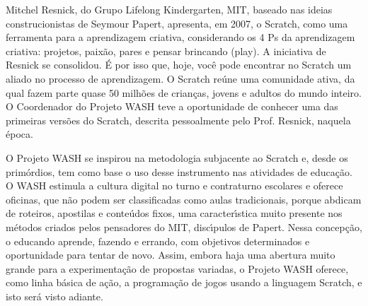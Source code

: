 \documentclass[
12pt,		%
openright,	%
twoside,  %
a4paper,			%
chapter=TITLE,		%
english,			%
french,				%
spanish,			%
brazil				%
]{USPSC-classe/USPSC_RedarTex}
\begin{document}
\noindent\begin{center}\mbox{\centering{}}\end{center}


Mitchel Resnick, do Grupo Lifelong Kindergarten, MIT, baseado nas ideias construcionistas de Seymour Papert, apresenta, em 2007, o Scratch, como uma ferramenta para a aprendizagem criativa, considerando  os 4 Ps da aprendizagem criativa: projetos, paix\~ao, pares e pensar brincando (play). A  iniciativa de Resnick se consolidou. \'E por isso que, hoje, voc\^e pode encontrar no Scratch um aliado no processo de aprendizagem. O Scratch re\'une uma comunidade ativa, da qual fazem parte quase 50 milh\~oes de crian\c{c}as, jovens e adultos do mundo inteiro. O Coordenador do Projeto WASH teve a oportunidade de conhecer uma das primeiras vers\~oes do Scratch, descrita pessoalmente pelo Prof. Resnick, naquela \'epoca.








O Projeto WASH se inspirou na metodologia subjacente ao Scratch e, desde os prim\'ordios, tem como base o uso desse instrumento nas atividades de educa\c{c}\~ao. O WASH estimula a cultura digital no turno e contraturno escolares e oferece oficinas, que n\~ao podem ser classificadas como aulas tradicionais, porque abdicam de roteiros, apostilas e conte\'udos fixos, uma caracter\'{\i}stica muito presente nos m\'etodos criados pelos pensadores do MIT, disc\'{\i}pulos de Papert. Nessa concep\c{c}\~ao, o educando aprende, fazendo e errando, com objetivos determinados e oportunidade para tentar de novo. Assim, embora haja uma abertura muito grande para a experimenta\c{c}\~ao de propostas variadas, o Projeto WASH oferece, como linha b\'asica de a\c{c}\~ao, a programa\c{c}\~ao de jogos usando a linguagem Scratch, e isto ser\'a visto adiante.
\end{document}
